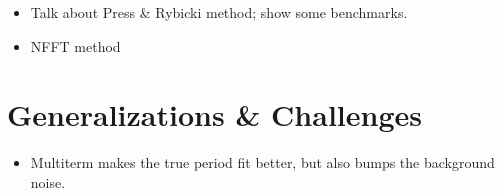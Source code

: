\documentclass[preprint]{aastex}
\begin{document}
\begin{itemize}
\item Talk about Press \& Rybicki method; show some benchmarks.
\item NFFT method
\end{itemize}

\section{Generalizations \& Challenges}

\begin{itemize}
\item Multiterm makes the true period fit better, but also bumps the background noise.
\end{itemize}



\end{document}
